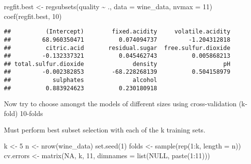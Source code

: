 \documentclass[
]{article}
\newenvironment{Shaded}{\begin{snugshade}}{\end{snugshade}}
\newcommand{\AttributeTok}[1]{\textcolor[rgb]{0.77,0.63,0.00}{#1}}
\newcommand{\ConstantTok}[1]{\textcolor[rgb]{0.00,0.00,0.00}{#1}}
\newcommand{\DecValTok}[1]{\textcolor[rgb]{0.00,0.00,0.81}{#1}}
\newcommand{\FunctionTok}[1]{\textcolor[rgb]{0.00,0.00,0.00}{#1}}
\newcommand{\NormalTok}[1]{#1}
\newcommand{\OtherTok}[1]{\textcolor[rgb]{0.56,0.35,0.01}{#1}}
\newcommand{\SpecialCharTok}[1]{\textcolor[rgb]{0.00,0.00,0.00}{#1}}
\begin{document}
\begin{Shaded}
\begin{Highlighting}[]
\NormalTok{regfit.best }\OtherTok{\textless{}{-}} \FunctionTok{regsubsets}\NormalTok{(quality }\SpecialCharTok{\textasciitilde{}}\NormalTok{ ., }\AttributeTok{data =}\NormalTok{ wine\_data, }\AttributeTok{nvmax =} \DecValTok{11}\NormalTok{)}
\FunctionTok{coef}\NormalTok{(regfit.best, }\DecValTok{10}\NormalTok{)}
\end{Highlighting}
\end{Shaded}

\begin{verbatim}
##          (Intercept)        fixed.acidity     volatile.acidity 
##         68.960350471          0.074094737         -1.204312818 
##          citric.acid       residual.sugar  free.sulfur.dioxide 
##         -0.132337321          0.045462743          0.005868213 
## total.sulfur.dioxide              density                   pH 
##         -0.002382853        -68.228268139          0.504158979 
##            sulphates              alcohol 
##          0.883924623          0.230180918
\end{verbatim}

Now try to choose amongst the models of different sizes using
cross-validation (k-fold) 10-folds

Must perform best subset selection with each of the k training sets.

\begin{Shaded}
\begin{Highlighting}[]
\NormalTok{k }\OtherTok{\textless{}{-}} \DecValTok{5}
\NormalTok{n }\OtherTok{\textless{}{-}} \FunctionTok{nrow}\NormalTok{(wine\_data)}
\FunctionTok{set.seed}\NormalTok{(}\DecValTok{1}\NormalTok{)}
\NormalTok{folds }\OtherTok{\textless{}{-}} \FunctionTok{sample}\NormalTok{(}\FunctionTok{rep}\NormalTok{(}\DecValTok{1}\SpecialCharTok{:}\NormalTok{k, }\AttributeTok{length =}\NormalTok{ n))}
\NormalTok{cv.errors }\OtherTok{\textless{}{-}} \FunctionTok{matrix}\NormalTok{(}\ConstantTok{NA}\NormalTok{, k, }\DecValTok{11}\NormalTok{, }\AttributeTok{dimnames =} \FunctionTok{list}\NormalTok{(}\ConstantTok{NULL}\NormalTok{, }\FunctionTok{paste}\NormalTok{(}\DecValTok{1}\SpecialCharTok{:}\DecValTok{11}\NormalTok{)))}
\end{Highlighting}
\end{Shaded}
\end{document}
